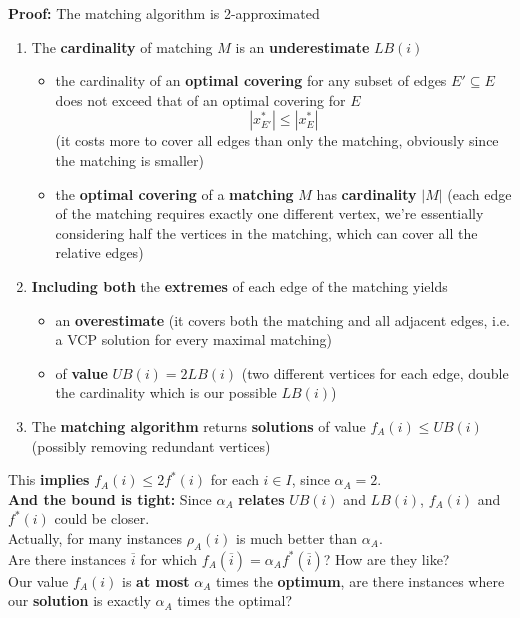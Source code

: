 \documentclass[11pt]{article}
\begin{document}
	\textbf{Proof:} The matching algorithm is 2-approximated
	\begin{enumerate}
		\item The \textbf{cardinality} of matching $M$ is an \textbf{underestimate} $LB (i )$
		\begin{itemize}
			\item the cardinality of an \textbf{optimal covering} for any subset of edges $E' \subseteq E$ does not exceed that of an optimal covering for $E$
			$$ |x_{E'}^\ast| \leq |x_E^\ast|$$
			(it costs more to cover all edges than only the matching, obviously since the matching is smaller)
			\item the \textbf{optimal covering} of a \textbf{matching} $M$ has \textbf{cardinality} $|M|$ (each edge of the matching requires exactly one different vertex, we're essentially considering half the vertices in the matching, which can cover all the relative edges)
		\end{itemize}
		\item \textbf{Including both} the \textbf{extremes} of each edge of the matching yields
		\begin{itemize}
			\item an \textbf{overestimate} (it covers both the matching and all adjacent edges, i.e. a VCP solution for every maximal matching)
			\item of \textbf{value} $UB (i ) = 2LB (i )$ (two different vertices for each edge, double the cardinality which is our possible $LB (i)$)
		\end{itemize}
		\item The \textbf{matching algorithm} returns \textbf{solutions} of value $f_A (i ) \leq UB (i )$ (possibly removing redundant vertices)
	\end{enumerate}
	This \textbf{implies} $f_A (i ) \leq 2f^\ast (i )$ for each $i \in I$, since $\alpha_A = 2$.\\
	
	\textbf{And the bound is tight:} Since $\alpha_A$ \textbf{relates} $UB (i )$ and $LB (i )$, $f_A (i )$ and $f^\ast (i )$ could be closer.\\
	Actually, for many instances $\rho_A (i )$ is much better than $\alpha_A$.\\
	
	Are there instances $\overline{i}$ for which $f_A (\overline{i}) = \alpha_A f^\ast (\overline{i})$? How are they like? \\
	Our value $f_A(i)$ is \textbf{at most} $\alpha_A$ times the \textbf{optimum}, are there instances where our \textbf{solution} is  exactly $\alpha_A$ times the optimal?\\
	
\end{document}

